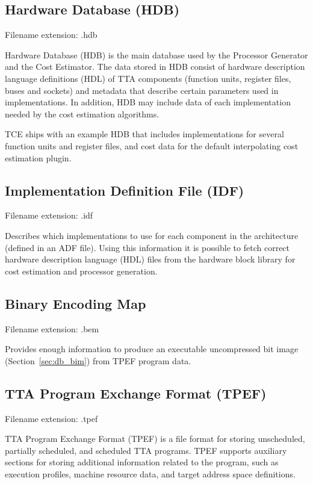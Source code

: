 \documentclass[twoside]{tceusermanual}
\begin{document}
\subsection{Hardware Database (HDB)}
\label{section:hdb}
Filename extension: .hdb

Hardware Database (HDB) is the main database used by the
Processor Generator and the Cost Estimator.  The data stored in HDB consist
of hardware description language definitions (HDL) of TTA components
(function units, register files, buses and sockets) and metadata that
describe certain parameters used in implementations. In addition, HDB may
include data of each implementation needed by the cost estimation
algorithms.

TCE ships with an example HDB that includes implementations for several
function units and register files, and cost data for the default
interpolating cost estimation plugin.

\subsection{Implementation Definition File (IDF)}
\label{sec:idf}

Filename extension:  .idf

Describes which implementations to use for each component in the
architecture (defined in an ADF file). Using this information it is possible
to fetch correct hardware description language
(HDL) files from the hardware block library for cost estimation and processor 
generation. 

\subsection{Binary Encoding Map}
\label{sec:bem}

Filename extension: .bem 

Provides enough information to produce an executable uncompressed bit
image (Section~\ref{sec:db_bim}) from TPEF program data.

\subsection{TTA Program Exchange Format (TPEF)}
\label{section:TPEF}

Filename extension: .tpef

TTA Program Exchange Format (TPEF) is a file format for storing unscheduled,
partially scheduled, and scheduled TTA programs. TPEF supports auxiliary
sections for storing additional information related to
the program, such as execution profiles, machine resource data, and target
address space definitions.
\end{document}
